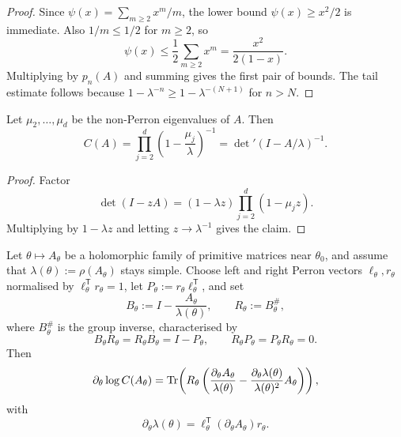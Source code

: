 \begin{proof}
  Since \(\psi(x)=\sum_{m\ge 2}x^m/m\), the lower bound
  \(\psi(x)\ge x^2/2\) is immediate. Also \(1/m\le 1/2\) for \(m\ge 2\),
  so
  \[
    \psi(x)\le \frac12\sum_{m\ge 2}x^m=\frac{x^2}{2(1-x)}.
  \]
  Multiplying by \(p_n(A)\) and summing gives the first pair of bounds.
  The tail estimate follows because
  \(1-\lambda^{-n}\ge 1-\lambda^{-(N+1)}\) for \(n>N\).
\end{proof}

\begin{proposition}
  \label{prop:finite-part-residue-reduced-determinant}
  Let \(\mu_2,\dots,\mu_d\) be the non-Perron eigenvalues of \(A\). Then
  \[
    C(A)
    =\prod_{j=2}^d\left(1-\frac{\mu_j}{\lambda}\right)^{-1}
    =\det\nolimits'(I-A/\lambda)^{-1}.
  \]
\end{proposition}

\begin{proof}
  Factor
  \[
    \det(I-zA)
    =(1-\lambda z)\prod_{j=2}^d(1-\mu_j z).
  \]
  Multiplying by \(1-\lambda z\) and letting \(z\to\lambda^{-1}\) gives
  the claim.
\end{proof}

\begin{theorem}
  \label{thm:finite-part-reduced-determinant-group-inverse-gradient}
  Let \(\theta\mapsto A_\theta\) be a holomorphic family of primitive
  matrices near \(\theta_0\), and assume that
  \(\lambda(\theta):=\rho(A_\theta)\) stays simple. Choose left and
  right Perron vectors \(\ell_\theta,r_\theta\) normalised by
  \(\ell_\theta^{\mathsf T}r_\theta=1\), let
  \(P_\theta:=r_\theta\ell_\theta^{\mathsf T}\), and set
  \[
    B_\theta:=I-\frac{A_\theta}{\lambda(\theta)},
    \qquad
    R_\theta:=B_\theta^{\#},
  \]
  where \(B_\theta^{\#}\) is the group inverse, characterised by
  \[
    B_\theta R_\theta=R_\theta B_\theta=I-P_\theta,
    \qquad
    R_\theta P_\theta=P_\theta R_\theta=0.
  \]
  Then
  \[
    \partial_\theta\log C(A_\theta)
    =\operatorname{Tr}\!\left(
      R_\theta\left(
        \frac{\partial_\theta A_\theta}{\lambda(\theta)}
        -\frac{\partial_\theta\lambda(\theta)}{\lambda(\theta)^2}
         A_\theta\right)\right),
  \]
  with
  \[
    \partial_\theta\lambda(\theta)
    =\ell_\theta^{\mathsf T}(\partial_\theta A_\theta)r_\theta.
  \]
\end{theorem}

